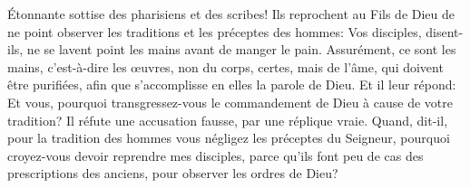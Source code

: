 Étonnante sottise des pharisiens et des scribes!
Ils reprochent au Fils de Dieu
	de ne point observer les traditions et les préceptes des hommes:
Vos disciples, disent-ils,
	ne se lavent point les mains avant de manger le pain.
Assurément, ce sont les mains, c’est-à-dire les œuvres,
	non du corps, certes, mais de l’âme, qui doivent être purifiées,
	afin que s’accomplisse en elles la parole de Dieu.
Et il leur répond: Et vous, pourquoi transgressez-vous le commandement de Dieu
	à cause de votre tradition?
Il réfute une accusation fausse, par une réplique vraie.
Quand, dit-il, pour la tradition des hommes
	vous négligez les préceptes du Seigneur,
	pourquoi croyez-vous devoir reprendre mes disciples,
	parce qu’ils font peu de cas des prescriptions des anciens,
	pour observer les ordres de Dieu?
